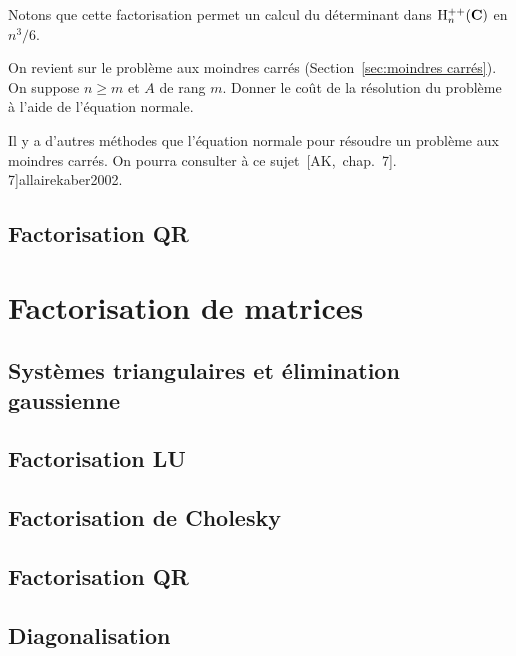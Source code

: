 Notons que cette factorisation permet un calcul du déterminant dans
$\mathrm{H}^{++}_n(\mathbf{C})$ en $n^3/6$.

\begin{exercice}
On revient sur le problème aux moindres carrés (Section~\ref{sec:moindres
carrés}). On suppose $n \geq m$ et $A$ de rang $m$. Donner le coût de la
résolution du problème à l'aide de l'équation normale.
\end{exercice}

\begin{remark}
Il y a d'autres méthodes que l'équation normale pour résoudre un problème aux
moindres carrés. On pourra consulter à ce sujet~[AK,~chap.~7].
7]{allairekaber2002}.
\end{remark}


\subsection{Factorisation QR}



\clearpage
\section{Factorisation de matrices}

\subsection{Systèmes triangulaires et élimination gaussienne}

\subsection{Factorisation LU}

\subsection{Factorisation de Cholesky}

\subsection{Factorisation QR}


\subsection{Diagonalisation}

